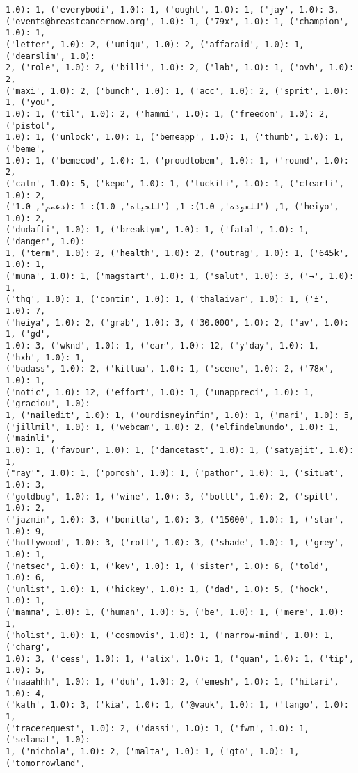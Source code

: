 \documentclass[11pt]{article}
\begin{document}
\begin{Verbatim}[commandchars=\\\{\}]
1.0): 1, ('everybodi', 1.0): 1, ('ought', 1.0): 1, ('jay', 1.0): 3,
('events@breastcancernow.org', 1.0): 1, ('79x', 1.0): 1, ('champion', 1.0): 1,
('letter', 1.0): 2, ('uniqu', 1.0): 2, ('affaraid', 1.0): 1, ('dearslim', 1.0):
2, ('role', 1.0): 2, ('billi', 1.0): 2, ('lab', 1.0): 1, ('ovh', 1.0): 2,
('maxi', 1.0): 2, ('bunch', 1.0): 1, ('acc', 1.0): 2, ('sprit', 1.0): 1, ('you',
1.0): 1, ('til', 1.0): 2, ('hammi', 1.0): 1, ('freedom', 1.0): 2, ('pistol',
1.0): 1, ('unlock', 1.0): 1, ('bemeapp', 1.0): 1, ('thumb', 1.0): 1, ('beme',
1.0): 1, ('bemecod', 1.0): 1, ('proudtobem', 1.0): 1, ('round', 1.0): 2,
('calm', 1.0): 5, ('kepo', 1.0): 1, ('luckili', 1.0): 1, ('clearli', 1.0): 2,
('دعمم', 1.0): 1, ('للعودة', 1.0): 1, ('للحياة', 1.0): 1, ('heiyo', 1.0): 2,
('dudafti', 1.0): 1, ('breaktym', 1.0): 1, ('fatal', 1.0): 1, ('danger', 1.0):
1, ('term', 1.0): 2, ('health', 1.0): 2, ('outrag', 1.0): 1, ('645k', 1.0): 1,
('muna', 1.0): 1, ('magstart', 1.0): 1, ('salut', 1.0): 3, ('→', 1.0): 1,
('thq', 1.0): 1, ('contin', 1.0): 1, ('thalaivar', 1.0): 1, ('£', 1.0): 7,
('heiya', 1.0): 2, ('grab', 1.0): 3, ('30.000', 1.0): 2, ('av', 1.0): 1, ('gd',
1.0): 3, ('wknd', 1.0): 1, ('ear', 1.0): 12, ("y'day", 1.0): 1, ('hxh', 1.0): 1,
('badass', 1.0): 2, ('killua', 1.0): 1, ('scene', 1.0): 2, ('78x', 1.0): 1,
('notic', 1.0): 12, ('effort', 1.0): 1, ('unappreci', 1.0): 1, ('graciou', 1.0):
1, ('nailedit', 1.0): 1, ('ourdisneyinfin', 1.0): 1, ('mari', 1.0): 5,
('jillmil', 1.0): 1, ('webcam', 1.0): 2, ('elfindelmundo', 1.0): 1, ('mainli',
1.0): 1, ('favour', 1.0): 1, ('dancetast', 1.0): 1, ('satyajit', 1.0): 1,
("ray'", 1.0): 1, ('porosh', 1.0): 1, ('pathor', 1.0): 1, ('situat', 1.0): 3,
('goldbug', 1.0): 1, ('wine', 1.0): 3, ('bottl', 1.0): 2, ('spill', 1.0): 2,
('jazmin', 1.0): 3, ('bonilla', 1.0): 3, ('15000', 1.0): 1, ('star', 1.0): 9,
('hollywood', 1.0): 3, ('rofl', 1.0): 3, ('shade', 1.0): 1, ('grey', 1.0): 1,
('netsec', 1.0): 1, ('kev', 1.0): 1, ('sister', 1.0): 6, ('told', 1.0): 6,
('unlist', 1.0): 1, ('hickey', 1.0): 1, ('dad', 1.0): 5, ('hock', 1.0): 1,
('mamma', 1.0): 1, ('human', 1.0): 5, ('be', 1.0): 1, ('mere', 1.0): 1,
('holist', 1.0): 1, ('cosmovis', 1.0): 1, ('narrow-mind', 1.0): 1, ('charg',
1.0): 3, ('cess', 1.0): 1, ('alix', 1.0): 1, ('quan', 1.0): 1, ('tip', 1.0): 5,
('naaahhh', 1.0): 1, ('duh', 1.0): 2, ('emesh', 1.0): 1, ('hilari', 1.0): 4,
('kath', 1.0): 3, ('kia', 1.0): 1, ('@vauk', 1.0): 1, ('tango', 1.0): 1,
('tracerequest', 1.0): 2, ('dassi', 1.0): 1, ('fwm', 1.0): 1, ('selamat', 1.0):
1, ('nichola', 1.0): 2, ('malta', 1.0): 1, ('gto', 1.0): 1, ('tomorrowland',

\end{Verbatim}
\end{document}
